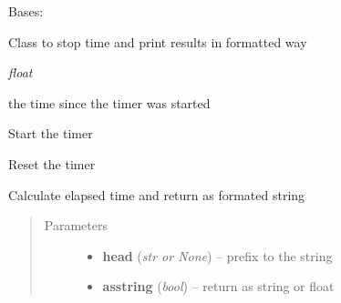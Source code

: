 \documentclass[letterpaper,10pt,english]{sphinxmanual}
\begin{document}
\begin{fulllineitems}
\label{api/ClearMap.Utils:ClearMap.Utils.Timer.Timer}
Bases: 

Class to stop time and print results in formatted way

\begin{fulllineitems}
\label{api/ClearMap.Utils:ClearMap.Utils.Timer.Timer.time}
\emph{float}

the time since the timer was started

\end{fulllineitems}


\begin{fulllineitems}
\label{api/ClearMap.Utils:ClearMap.Utils.Timer.Timer.start}
Start the timer

\end{fulllineitems}


\begin{fulllineitems}
\label{api/ClearMap.Utils:ClearMap.Utils.Timer.Timer.reset}
Reset the timer

\end{fulllineitems}


\begin{fulllineitems}
\label{api/ClearMap.Utils:ClearMap.Utils.Timer.Timer.elapsedTime}
Calculate elapsed time and return as formated string
\begin{quote}\begin{description}
\item[{Parameters}] \leavevmode\begin{itemize}
\item {} 
\textbf{head} (\emph{str or None}) --
prefix to the string

\item {} 
\textbf{asstring} (\emph{bool}) --
return as string or float

\end{itemize}


\end{description}
\end{quote}
\end{fulllineitems}
\end{fulllineitems}
\end{document}
